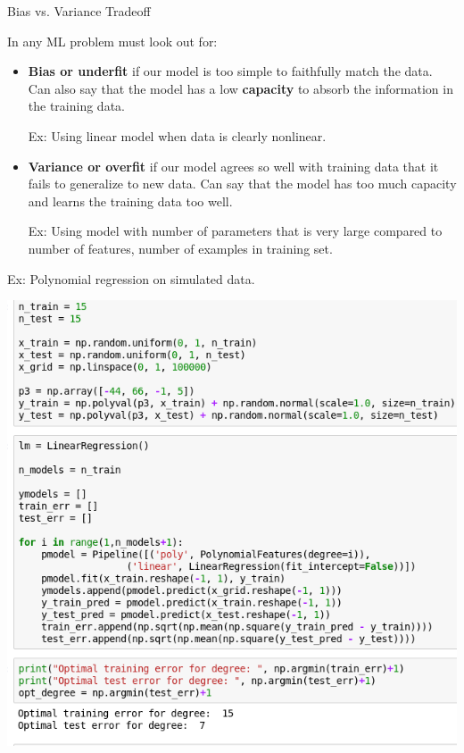 \documentclass[12pt,t]{beamer}
\begin{document}
\begin{frame}{Bias vs. Variance Tradeoff} 

In any ML problem must look out for:
\begin{itemize}
\item {\bf Bias or underfit} if our model is too simple to faithfully match the data.   Can also say that the model has a low {\bf capacity} to absorb the information in the training data.
\bigskip

 Ex: Using linear model when data is clearly nonlinear.

\bigskip 

\item {\bf Variance or overfit} if our model agrees so well with training data that it fails to generalize to new data.  Can say that the model has too much capacity and learns the training data too well.

\bigskip 
Ex: Using model with number of parameters that is very large compared to number of features, number of examples in training set.
\end{itemize}

\end{frame}

\begin{frame}

Ex: Polynomial regression on simulated data.

\centerline{
\includegraphics[height=0.9\textheight]{./images/biasvsvariance_code.png}
} 
\end{frame}
\end{document}

